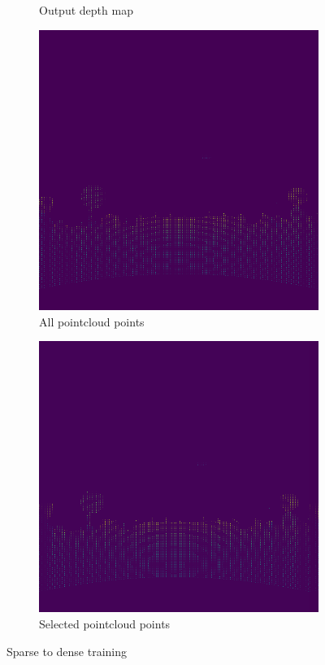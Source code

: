 \documentclass[twoside]{ctuthesis}
\theoremstyle{plain}
\theoremstyle{definition}
\theoremstyle{note}
\begin{document}
\begin{figure}
\begin{subfigure}[b]{0.4\textwidth}
		\caption{Output depth map}
	\end{subfigure}
	\hfill
	\begin{subfigure}[b]{0.4\textwidth}
		\centering
		\includegraphics[width=\textwidth]{s2d_all.png}
		\caption{All pointcloud points}
	\end{subfigure}
	\hfill
	\begin{subfigure}[b]{0.4\textwidth}
		\centering
		\includegraphics[width=\textwidth]{s2d_select.png}
		\caption{Selected pointcloud points}
	\end{subfigure}
	\caption{Sparse to dense training}
\end{figure}
\end{document}
